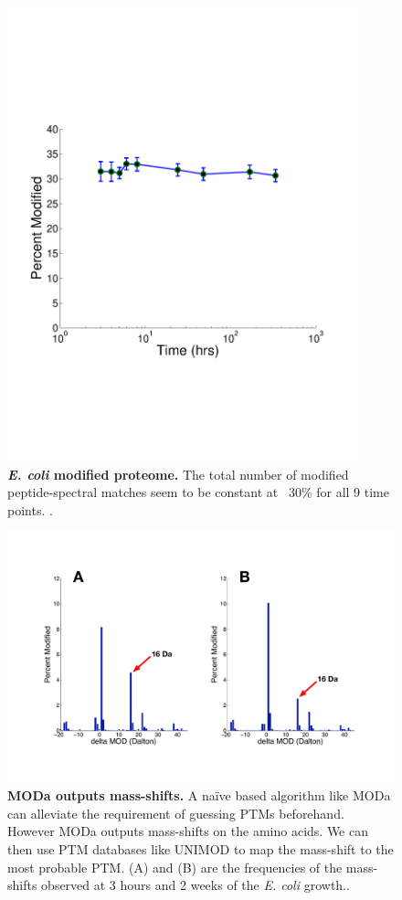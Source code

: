 \documentclass[12pt]{article}
\begin{document}
\begin{figure}[!ht]
\centerline{\includegraphics[width=4in]{Figures/PTM_modified.pdf}}
\caption{\label{fig:ModifiedPTM}\textbf{\emph{E. coli} modified proteome.} The total number of modified peptide-spectral matches seem to be constant at ~30\% for all 9 time points. .
}
\end{figure}

\clearpage
\begin{figure}[!ht]
\centerline{\includegraphics[width=8in]{Figures/PTMdalton.pdf}}
\caption{\label{fig:PTMinDalton}\textbf{MODa outputs mass-shifts.} A naïve based algorithm like MODa can alleviate the requirement of guessing PTMs beforehand. However MODa outputs mass-shifts on the amino acids. We can then use PTM databases like UNIMOD to map the mass-shift to the most probable PTM. (A) and (B) are the frequencies of the mass-shifts observed  at 3 hours and 2 weeks of the \emph{E. coli} growth..}
\end{figure}
\end{document}
